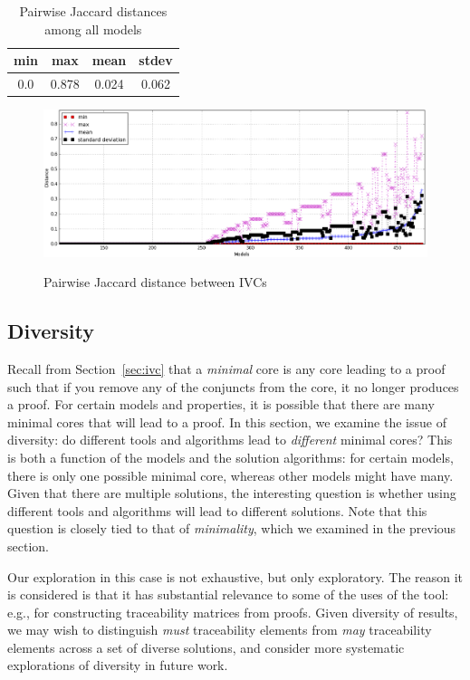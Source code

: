 \begin{table}
  \centering
  \begin{tabular}{ |c|c|c|c| }
    \hline
     min & max & mean & stdev \\[0.5ex]
    \hline
     0.0   & 0.878 & 0.024 & 0.062 \\[0.5ex]
    \hline
  \end{tabular}
  \caption{Pairwise Jaccard distances among all models}
  \label{tab:jaccard-avg}
\end{table}

\begin{figure}
  \centering
  \includegraphics[width=\textwidth]{figs/jacdis2.png} \\
  \caption{Pairwise Jaccard distance between IVCs}\label{fig:jacdis}
\end{figure}

\subsection{Diversity}
\label{sec:diversity}
Recall from Section~\ref{sec:ivc} that a {\em minimal} core is any core leading to a proof such that if you remove any of the conjuncts from the core, it no longer produces a proof.  For certain models and properties, it is possible that there are many minimal cores that will lead to a proof.  In this section, we examine the issue of diversity: do different tools and algorithms lead to {\em different} minimal cores?  This is both a function of the models and the solution algorithms: for certain models, there is only one possible minimal core, whereas other models might have many. Given that there are multiple solutions, the interesting question is whether using different tools and algorithms will lead to different solutions.  Note that this question is closely tied to that of {\em minimality}, which we examined in the previous section.

Our exploration in this case is not exhaustive, but only exploratory.  The reason it is considered is that it has substantial relevance to some of the uses of the tool: e.g., for constructing traceability matrices from proofs.  Given diversity of results, we may wish to distinguish {\em must} traceability elements from {\em may} traceability elements across a set of diverse solutions, and consider more systematic explorations of diversity in future work.

